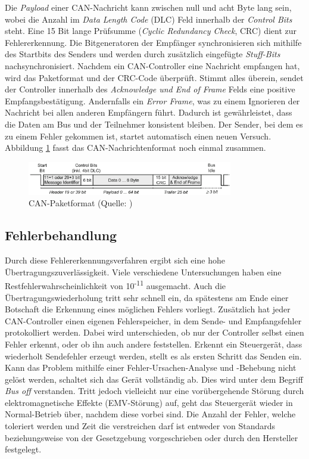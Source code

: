 Die \textit{Payload} einer CAN-Nachricht kann zwischen null und acht Byte lang sein, wobei die Anzahl im \textit{Data Length Code} (DLC) Feld innerhalb der \textit{Control Bits} steht. Eine 15 Bit lange Prüfsumme (\textit{Cyclic Redundancy Check}, CRC) dient zur Fehlererkennung. Die Bitgeneratoren der Empfänger synchronisieren sich mithilfe des Startbits des Senders und werden durch zusätzlich eingefügte \textit{Stuff-Bits} nachsynchronisiert. Nachdem ein CAN-Controller eine Nachricht empfangen hat, wird das Paketformat und der CRC-Code überprüft. Stimmt alles überein, sendet der Controller innerhalb des \textit{Acknowledge und End of Frame} Felds eine positive Empfangsbestätigung. Andernfalls ein \textit{Error Frame}, was zu einem Ignorieren der Nachricht bei allen anderen Empfängern führt. Dadurch ist gewährleistet, dass die Daten am Bus und der Teilnehmer konsistent bleiben. Der Sender, bei dem es zu einem Fehler gekommen ist, startet automatisch einen neuen Versuch. Abbildung \ref{fig:can_packet} fasst das CAN-Nachrichtenformat noch einmal zusammen.

\begin{figure}[htbp]
	\centering
		\includegraphics[width=0.8\textwidth]{images/can_packet_format.png}
	\caption{CAN-Paketformat (Quelle: \cite{Zimmermann2014})}
	\label{fig:can_packet}
\end{figure}

\subsection{Fehlerbehandlung}

Durch diese Fehlererkennungsverfahren ergibt sich eine hohe Übertragungszuverlässigkeit. Viele verschiedene Untersuchungen haben eine Restfehlerwahrscheinlichkeit von 10\textsuperscript{-11} ausgemacht. Auch die Übertragungswiederholung tritt sehr schnell ein, da spätestens am Ende einer Botschaft die Erkennung eines möglichen Fehlers vorliegt. Zusätzlich hat jeder CAN-Controller einen eigenen Fehlerspeicher, in dem Sende- und Empfangsfehler protokolliert werden. Dabei wird unterschieden, ob nur der Controller selbst einen Fehler erkennt, oder ob ihn auch andere feststellen. Erkennt ein Steuergerät, dass wiederholt Sendefehler erzeugt werden, stellt es als ersten Schritt das Senden ein. Kann das Problem mithilfe einer Fehler-Ursachen-Analyse und -Behebung nicht gelöst werden, schaltet sich das Gerät vollständig ab. Dies wird unter dem Begriff \textit{Bus off} verstanden. Tritt jedoch vielleicht nur eine vorübergehende Störung durch elektromagnetische Effekte (EMV-Störung) auf, geht das Steuergerät wieder in Normal-Betrieb über, nachdem diese vorbei sind. Die Anzahl der Fehler, welche toleriert werden und Zeit die verstreichen darf ist entweder von Standards beziehungsweise von der Gesetzgebung vorgeschrieben oder durch den Hersteller festgelegt.

